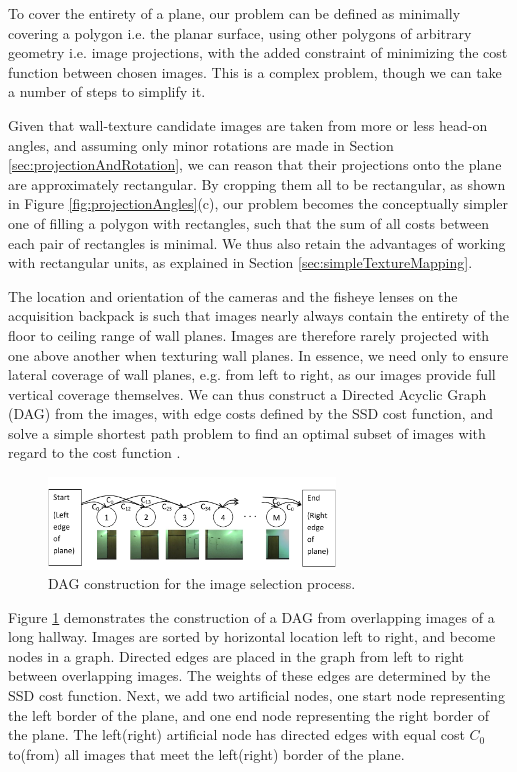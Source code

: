 \documentclass[]{spie}  %
\begin{document}
To cover the entirety of a plane, our problem can be defined as
minimally covering a polygon i.e. the planar surface, using other
polygons of arbitrary geometry i.e. image projections, with the added
constraint of minimizing the cost function between chosen images.
This is a complex problem, though we can take a number of steps to
simplify it.

Given that wall-texture candidate images are taken from more or less
head-on angles, and assuming only minor rotations are made in Section
\ref{sec:projectionAndRotation}, we can reason that their projections
onto the plane are approximately rectangular. By cropping them all to
be rectangular, as shown in Figure \ref{fig:projectionAngles}(c), our
problem becomes the conceptually simpler one of filling a polygon with
rectangles, such that the sum of all costs between each pair of
rectangles is minimal. We thus also retain the advantages of working
with rectangular units, as explained in Section
\ref{sec:simpleTextureMapping}.

The location and orientation of the cameras and the fisheye lenses on
the acquisition backpack is such that images nearly always contain the
entirety of the floor to ceiling range of wall planes. Images are
therefore rarely projected with one above another when texturing wall
planes. In essence, we need only to ensure lateral coverage of wall
planes, e.g. from left to right, as our images provide full vertical
coverage themselves. We can thus construct a Directed Acyclic Graph
(DAG) from the images, with edge costs defined by the SSD cost
function, and solve a simple shortest path problem to find an optimal
subset of images with regard to the cost function \cite{dijkstra}.

\begin{figure}
  \centering
  \includegraphics[width=3in]{dagCreation.pdf}
  \caption{DAG construction for the image selection process. \\}
  \label{fig:dagCreation}
\end{figure}

Figure \ref{fig:dagCreation} demonstrates the construction of a DAG
from overlapping images of a long hallway. Images are sorted by
horizontal location left to right, and become nodes in a
graph. Directed edges are placed in the graph from left to right
between overlapping images. The weights of these edges are determined
by the SSD cost function. Next, we add two artificial nodes, one start
node representing the left border of the plane, and one end node
representing the right border of the plane. The left(right) artificial
node has directed edges with equal cost $C_0$ to(from) all images that
meet the left(right) border of the plane.
\end{document}
